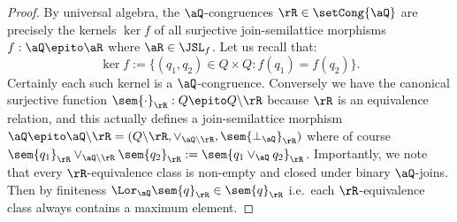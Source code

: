 \documentclass{article}
\begin{document}
\begin{proof}
By universal algebra, the $\aQ$-congruences $\rR \in \setCong{\aQ}$ are precisely the kernels $\ker{f}$ of all surjective join-semilattice morphisms $f : \aQ \epito \aR$ where $\aR \in \JSL_f$. Let us recall that:
\[
\ker{f} := \{ (q_1,q_2) \in Q \times Q : f(q_1) = f(q_2) \}.
\]
Certainly each such kernel is a $\aQ$-congruence. Conversely we have the canonical surjective function $\sem{\cdot}_\rR : Q \epito Q \backslash \rR$ because $\rR$ is an equivalence relation, and this actually defines a  join-semilattice morphism $\aQ \epito \aQ\backslash\rR = (Q \backslash\rR,\lor_{\aQ\backslash\rR},\sem{\bot_\aQ}_\rR)$ where of course $\sem{q_1}_\rR \lor_{\aQ\backslash\rR} \sem{q_2}_\rR := \sem{q_1 \lor_\aQ q_2}_\rR$. Importantly, we note that every $\rR$-equivalence class is non-empty and closed under binary $\aQ$-joins. Then by finiteness $\Lor_\aQ \sem{q}_\rR \in \sem{q}_\rR$ i.e.\ each $\rR$-equivalence class always contains a maximum element.


\end{proof}
\end{document}

